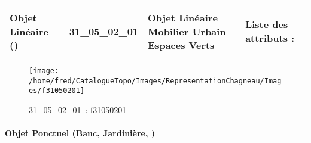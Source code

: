 \documentclass[12pt,titlepage]{book}
\begin{document}
\renewcommand{\arraystretch}{1.2}
\begin{supertabular}{|p{10cm}|c|p{13cm}|p{12cm}|}
 Objet Linéaire () & 31\_05\_02\_01 & Objet Linéaire Mobilier Urbain Espaces Verts & Liste des attributs :
\begin{enumerate}
\end{enumerate}
\\
\hline
\end{supertabular}
\begin{figure}[h!]
  \hfill         %
  \begin{minipage}[t]{3cm}
    \begin{center}
      \texttt{[image: /home/fred/CatalogueTopo/Images/RepresentationChagneau/Images/f31050201]}
      \caption[~31\_05\_02\_01]{\small{31\_05\_02\_01~:} \tiny{f31050201}}\label{f31050201}
    \end{center}
  \end{minipage}
\end{figure}


\paragraph{Objet Ponctuel (Banc, Jardinière,  )}
\noindent
\vspace{\baselineskip}
\end{document}
